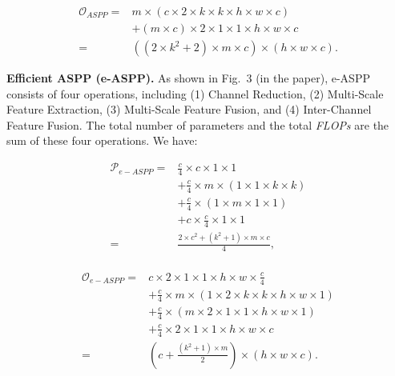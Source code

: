\documentclass[letterpaper]{article} \usepackage{aaai22}  \usepackage{times}  \usepackage{helvet}  \usepackage{courier}  \usepackage[hyphens]{url}  \usepackage{graphicx} \urlstyle{rm} \def\UrlFont{\rm}  \usepackage{natbib}  \usepackage{caption} \usepackage{booktabs}
\begin{document}
\begin{equation}
\begin{split}
    \mathcal{O}_{ASPP} =& m \times (c \times 2 \times k \times k \times h \times w \times c) \\ 
    &+ (m \times c) \times 2 \times 1 \times 1 \times h \times w \times c \\
    =& ((2 \times k^2 + 2) \times m \times c) \times (h \times w \times c).
\end{split}
\end{equation}





\textbf{Efficient ASPP (e-ASPP).} As shown in Fig.\,{\color{red} 3} (in the paper), e-ASPP consists of four operations, including (1) Channel Reduction, (2) Multi-Scale Feature Extraction, (3) Multi-Scale Feature Fusion, and (4) Inter-Channel Feature Fusion. The total number of parameters and the total {\it FLOPs} are the sum of these four operations. We have:

\begin{equation}
\begin{split}
        \mathcal{P}_{e-ASPP} =& \frac{c}{4} \times c \times 1 \times 1 \\ &+ \frac{c}{4} \times m \times (1 \times 1 \times k \times k) \\ 
        &+ \frac{c}{4} \times (1 \times m \times 1 \times 1)
        \\ &+ c \times \frac{c}{4} \times 1 \times 1 \\
        =& \frac{2 \times c^2 + (k^2 + 1) \times m \times c}{4}, \\
\end{split}
\end{equation}


\begin{equation}
\begin{split}
        \mathcal{O}_{e-ASPP} =& c \times 2 \times 1 \times 1 \times h \times w \times \frac{c}{4} \\
        &+ \frac{c}{4} \times m \times (1 \times 2 \times k \times k \times h \times w \times 1) \\
        &+ \frac{c}{4} \times (m \times 2 \times 1 \times 1 \times h \times w \times 1) \\
        &+ \frac{c}{4} \times 2 \times 1 \times 1 \times h \times w \times c \\
        =& (c + \frac{(k^2 + 1) \times m}{2}) \times (h \times w \times c) .
\end{split}
\end{equation}
\end{document}
